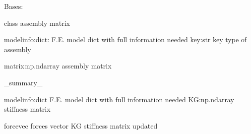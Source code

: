 \documentclass[letterpaper,10pt,english]{sphinxmanual}
\begin{document}
\begin{fulllineitems}
\label{\detokenize{myfempy.core:myfempy.core.assembler.Assembler}}
\pysigstartsignatures
{}
\pysigstopsignatures
\sphinxAtStartPar
Bases: 

\begin{fulllineitems}
\label{\detokenize{myfempy.core:myfempy.core.assembler.Assembler.assembler}}
\pysigstartsignatures
{}
\pysigstopsignatures
\sphinxAtStartPar
class assembly matrix
\begin{description}
\sphinxAtStartPar
modelinfo:dict:   \textendash{} F.E. model dict with full information needed
key:str           \textendash{} key type of assembly

\sphinxAtStartPar
matrix:np.ndarray \textendash{} assembly matrix

\end{description}

\end{fulllineitems}


\begin{fulllineitems}
\label{\detokenize{myfempy.core:myfempy.core.assembler.Assembler.loads}}
\pysigstartsignatures
{}
\pysigstopsignatures
\sphinxAtStartPar
\_summary\_
\begin{description}
\sphinxAtStartPar
modelinfo:dict     \textendash{} F.E. model dict with full information needed
KG:np.ndarray      \textendash{} stiffness matrix

\sphinxAtStartPar
forcevec          \textendash{} forces vector
KG                \textendash{} stiffness matrix updated

\end{description}

\end{fulllineitems}


\end{fulllineitems}
\end{document}
